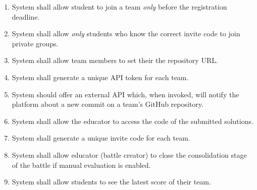 \begin{enumerate}[label=$\bullet$ \textbf{R\arabic*:}]
    \item System shall allow student to join a team \textit{only} before the registration deadline.
    \item System shall allow \textit{only} students who know the correct invite code to join private groups.
    \item System shall allow team members to set their the repository URL.
    \item System shall generate a unique API token for each team.
    \item System should offer an external API which, when invoked, will notify the platform about a new commit on a team’s GitHub repository.
    \item System shall allow the educator to access the code of the submitted solutions.
    \item System shall generate a unique invite code for each team.
    \item System shall allow educator (battle creator) to close the consolidation stage of the battle if manual evaluation is enabled.
    \item System shall allow students to see the latest score of their team.
\end{enumerate}
\newpage

